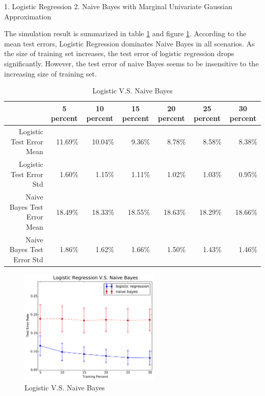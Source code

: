 \documentclass[12pt,oneside,a4paper]{article}
\begin{document}
\hspace*{1em}1. Logistic Regression\newline
\hspace*{1em}2. Naive Bayes with Marginal Univariate Gaussian Approximation

The simulation result is summarized in table \ref{logistic vs naive bayes} and figure \ref{fig:logistic vs naive bayes}. According to the mean test errors, Logistic Regression dominates Naive Bayes in all scenarios. As the size of training set increases, the test error of logistic regression drops significantly. However, the test error of naive Bayes seems to be insensitive to the increasing size of training set.

\begin{table}[ht!]
\centering
\caption{Logistic V.S. Naive Bayes}
\begin{tabular}{rrrrrrr}
\toprule
 \multicolumn{1}{c}{  } & \multicolumn{1}{c}{ 5 percent } & \multicolumn{1}{c}{ 10 percent } & \multicolumn{1}{c}{ 15 percent } & \multicolumn{1}{c}{ 20 percent } & \multicolumn{1}{c}{ 25 percent } & \multicolumn{1}{c}{ 30 percent } \\
\midrule
 Logistic Test Error Mean & 11.69\% & 10.04\% & 9.36\% & 8.78\% & 8.58\% & 8.38\% \\
 Logistic Test Error Std & 1.60\% & 1.15\% & 1.11\% & 1.02\% & 1.03\% & 0.95\% \\
 Naive Bayes Test Error Mean & 18.49\% & 18.33\% & 18.55\% & 18.63\% & 18.29\% & 18.66\% \\
 Naive Bayes Test Error Std & 1.86\% & 1.62\% & 1.66\% & 1.50\% & 1.43\% & 1.46\% \\
\bottomrule
\end{tabular}
\label{logistic vs naive bayes}
\end{table}

\begin{figure}[ht!]
    \centering
    \includegraphics[width=0.6\textwidth]{./figure/nb_vs_logreg.pdf}
    \caption{Logistic V.S. Naive Bayes}
    \label{fig:logistic vs naive bayes}
\end{figure}


\clearpage
\printbibliography
\end{document}
